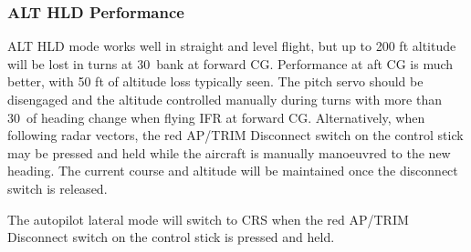 \subsubsection{ALT HLD Performance} ALT HLD mode works well in straight and level flight, but up to 200 ft altitude will be lost in turns at 30\textdegree \ bank at forward CG. Performance at aft CG is much better, with 50 ft of altitude loss typically seen. The pitch servo should be disengaged and the altitude controlled manually during turns with more than 30\textdegree \ of heading change when flying IFR at forward CG. Alternatively, when following radar vectors, the red AP/TRIM Disconnect switch on the control stick may be pressed and held while the aircraft is manually manoeuvred to the new heading. The current course and altitude will be maintained once the disconnect switch is released.

\begin{Note}
  The autopilot lateral mode will switch to CRS when the red AP/TRIM Disconnect switch on the control stick is pressed and held.
\end{Note}
\cleardoublepage
